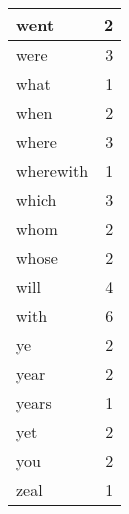 \begin{center}
\begin{longtable}{l|r}
went & 2 \\ \hline
were & 3 \\ \hline
what & 1 \\ \hline
when & 2 \\ \hline
where & 3 \\ \hline
wherewith & 1 \\ \hline
which & 3 \\ \hline
whom & 2 \\ \hline
whose & 2 \\ \hline
will & 4 \\ \hline
with & 6 \\ \hline
ye & 2 \\ \hline
year & 2 \\ \hline
years & 1 \\ \hline
yet & 2 \\ \hline
you & 2 \\ \hline
zeal & 1 \\ \hline
\end{longtable}
\end{center}



\normalsize



